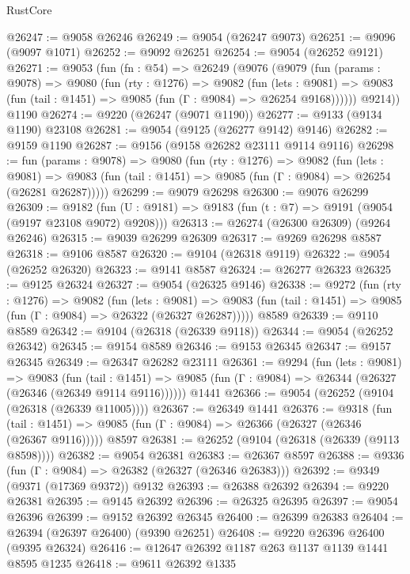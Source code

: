 \begin{lexlean}{RustCore}
\begin{coremodule}
@26247 := @9058 @26246
@26249 := @9054 (@26247 @9073)
@26251 := @9096 (@9097 @1071)
@26252 := @9092 @26251
@26254 := @9054 (@26252 @9121)
@26271 := @9053
    (fun (fn : @54) =>
    @26249
      (@9076
        (@9079
          (fun (params : @9078) =>
          @9080
            (fun (rty : @1276) =>
            @9082
              (fun (lets : @9081) =>
              @9083 (fun (tail : @1451) => @9085 (fun (Γ : @9084) => @26254 @9168))))))
        @9214))
    @1190
@26274 := @9220 (@26247 (@9071 @1190))
@26277 := @9133 (@9134 @1190) @23108
@26281 := @9054 (@9125 (@26277 @9142) @9146)
@26282 := @9159 @1190
@26287 := @9156 (@9158 @26282 @23111 @9114 @9116)
@26298 := fun (params : @9078) =>
  @9080
    (fun (rty : @1276) =>
    @9082
      (fun (lets : @9081) =>
      @9083 (fun (tail : @1451) => @9085 (fun (Γ : @9084) => @26254 (@26281 @26287)))))
@26299 := @9079 @26298
@26300 := @9076 @26299
@26309 := @9182
    (fun (U : @9181) => @9183 (fun (t : @7) => @9191 (@9054 (@9197 @23108 @9072) @9208)))
@26313 := @26274 (@26300 @26309) (@9264 @26246)
@26315 := @9039 @26299 @26309
@26317 := @9269 @26298 @8587
@26318 := @9106 @8587
@26320 := @9104 (@26318 @9119)
@26322 := @9054 (@26252 @26320)
@26323 := @9141 @8587
@26324 := @26277 @26323
@26325 := @9125 @26324
@26327 := @9054 (@26325 @9146)
@26338 := @9272
    (fun (rty : @1276) =>
    @9082
      (fun (lets : @9081) =>
      @9083 (fun (tail : @1451) => @9085 (fun (Γ : @9084) => @26322 (@26327 @26287)))))
    @8589
@26339 := @9110 @8589
@26342 := @9104 (@26318 (@26339 @9118))
@26344 := @9054 (@26252 @26342)
@26345 := @9154 @8589
@26346 := @9153 @26345
@26347 := @9157 @26345
@26349 := @26347 @26282 @23111
@26361 := @9294
    (fun (lets : @9081) =>
    @9083
      (fun (tail : @1451) =>
      @9085 (fun (Γ : @9084) => @26344 (@26327 (@26346 (@26349 @9114 @9116))))))
    @1441
@26366 := @9054 (@26252 (@9104 (@26318 (@26339 @11005))))
@26367 := @26349 @1441
@26376 := @9318
    (fun (tail : @1451) => @9085 (fun (Γ : @9084) => @26366 (@26327 (@26346 (@26367 @9116)))))
    @8597
@26381 := @26252 (@9104 (@26318 (@26339 (@9113 @8598))))
@26382 := @9054 @26381
@26383 := @26367 @8597
@26388 := @9336 (fun (Γ : @9084) => @26382 (@26327 (@26346 @26383)))
@26392 := @9349 (@9371 (@17369 @9372)) @9132
@26393 := @26388 @26392
@26394 := @9220 @26381
@26395 := @9145 @26392
@26396 := @26325 @26395
@26397 := @9054 @26396
@26399 := @9152 @26392 @26345
@26400 := @26399 @26383
@26404 := @26394 (@26397 @26400) (@9390 @26251)
@26408 := @9220 @26396 @26400 (@9395 @26324)
@26416 := @12647 @26392 @1187 @263 @1137 @1139 @1441 @8595 @1235
@26418 := @9611 @26392 @1335

\end{coremodule}
\end{lexlean}
